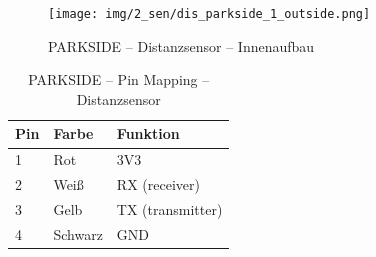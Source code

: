 \pagebreak[1]
\begin{figure}[ht]
	\begin{center}
		\texttt{[image: img/2\_sen/dis\_parkside\_1\_outside.png]}
		\caption{PARKSIDE – Distanzsensor – Innenaufbau}
		\label{img_2_2:sen_dis_parkside:1}
	\end{center}
\end{figure}
\pagebreak[1]

\pagebreak[1]
\begin{table}[ht]
	\centering
	\caption{PARKSIDE – Pin Mapping – Distanzsensor}
	\label{parkside:pinmapping}
	\begin{tabular}{l|ll}
		\hline
		\textbf{Pin} & \textbf{Farbe} & \textbf{Funktion} \\ \hline
		1            & Rot            & 3V3               \\
		2            & Weiß           & RX (receiver)     \\
		3            & Gelb           & TX (transmitter)  \\
		4            & Schwarz        & GND               \\ \hline
	\end{tabular}
\end{table}
\pagebreak[1]








